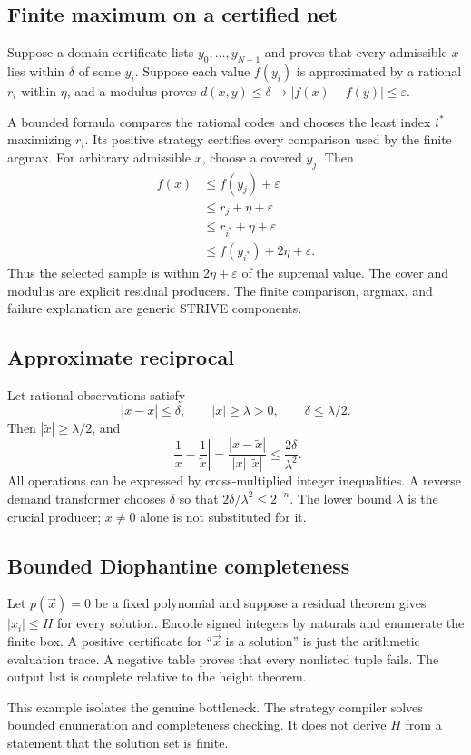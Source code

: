 \subsection{Finite maximum on a certified net}

Suppose a domain certificate lists \(y_0,\ldots,y_{N-1}\) and proves that every
admissible \(x\) lies within \(\delta\) of some \(y_i\).  Suppose each value
\(f(y_i)\) is approximated by a rational \(r_i\) within \(\eta\), and a modulus
proves \(d(x,y)\le\delta\to |f(x)-f(y)|\le\varepsilon\).

A bounded formula compares the rational codes and chooses the least index
\(i^*\) maximizing \(r_i\).  Its positive strategy certifies every comparison
used by the finite argmax.  For arbitrary admissible \(x\), choose a covered
\(y_j\).  Then
\begin{align*}
 f(x)&\le f(y_j)+\varepsilon\\
     &\le r_j+\eta+\varepsilon\\
     &\le r_{i^*}+\eta+\varepsilon\\
     &\le f(y_{i^*})+2\eta+\varepsilon.
\end{align*}
Thus the selected sample is within \(2\eta+\varepsilon\) of the supremal value.
The cover and modulus are explicit residual producers.  The finite comparison,
argmax, and failure explanation are generic STRIVE components.

\subsection{Approximate reciprocal}

Let rational observations satisfy
\[
 |x-\tilde x|\le\delta,
 \qquad |x|\ge\lambda>0,
 \qquad \delta\le\lambda/2.
\]
Then \(|\tilde x|\ge\lambda/2\), and
\[
 \left|\frac1x-\frac1{\tilde x}\right|
 =\frac{|x-\tilde x|}{|x|\,|\tilde x|}
 \le \frac{2\delta}{\lambda^2}.
\]
All operations can be expressed by cross-multiplied integer inequalities.  A
reverse demand transformer chooses \(\delta\) so that
\(2\delta/\lambda^2\le2^{-n}\).  The lower bound \(\lambda\) is the crucial
producer; \(x\ne0\) alone is not substituted for it.

\subsection{Bounded Diophantine completeness}

Let \(p(\vec x)=0\) be a fixed polynomial and suppose a residual theorem gives
\(|x_i|\le H\) for every solution.  Encode signed integers by naturals and
enumerate the finite box.  A positive certificate for ``\(\vec x\) is a
solution'' is just the arithmetic evaluation trace.  A negative table proves
that every nonlisted tuple fails.  The output list is complete relative to the
height theorem.

This example isolates the genuine bottleneck.  The strategy compiler solves
bounded enumeration and completeness checking.  It does not derive \(H\) from
a statement that the solution set is finite.
